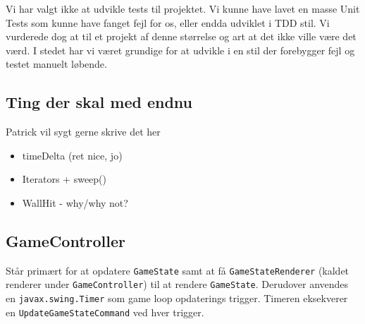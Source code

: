 \documentclass[titlepage,danish]{article}
\newcommand{\code}[1]{\texttt{#1}}
\begin{document}
Vi har valgt ikke at udvikle tests til projektet. Vi kunne have lavet en masse Unit Tests som kunne
have fanget fejl for os, eller endda udviklet i TDD stil. Vi vurderede dog at til et projekt af
denne størrelse og art at det ikke ville være det værd. I stedet har vi været grundige for at
udvikle i en stil der forebygger fejl og testet manuelt løbende.

\subsection{Ting der skal med endnu}
Patrick vil sygt gerne skrive det her
\begin{itemize}
\item timeDelta (ret nice, jo)
\item Iterators + sweep()
\item WallHit - why/why not?
\end{itemize}

\subsection{GameController}
Står primært for at opdatere \code{GameState} samt at få \code{GameStateRenderer} (kaldet renderer
under \code{GameController}) til at rendere \code{GameState}. Derudover anvendes en
\code{javax.swing.Timer} som game loop opdaterings trigger. Timeren eksekverer en
\code{UpdateGameStateCommand} ved hver trigger.
\end{document}
